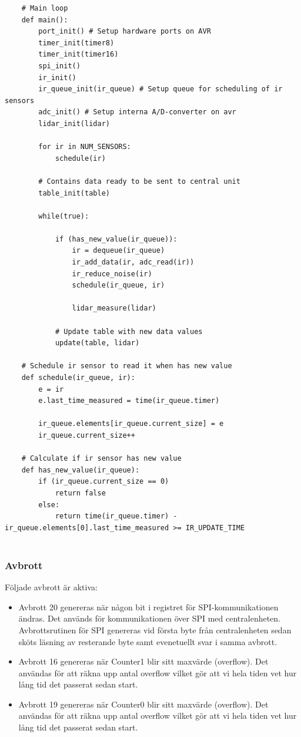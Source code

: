 \documentclass[a4paper,titlepage,12pt]{article}
\begin{document}
    \begin{lstlisting}
    # Main loop
	def main():
        port_init() # Setup hardware ports on AVR
        timer_init(timer8)
        timer_init(timer16)
        spi_init()
        ir_init()
        ir_queue_init(ir_queue) # Setup queue for scheduling of ir sensors
        adc_init() # Setup interna A/D-converter on avr
        lidar_init(lidar)
        
        for ir in NUM_SENSORS:
            schedule(ir)
        
        # Contains data ready to be sent to central unit
        table_init(table)
        
        while(true):

            if (has_new_value(ir_queue)):
                ir = dequeue(ir_queue)
                ir_add_data(ir, adc_read(ir))
                ir_reduce_noise(ir)
                schedule(ir_queue, ir)
        		
                lidar_measure(lidar)
        	
            # Update table with new data values
            update(table, lidar)
        
    # Schedule ir sensor to read it when has new value
    def schedule(ir_queue, ir):
        e = ir
        e.last_time_measured = time(ir_queue.timer)

        ir_queue.elements[ir_queue.current_size] = e
        ir_queue.current_size++
	    
	# Calculate if ir sensor has new value
	def has_new_value(ir_queue):
        if (ir_queue.current_size == 0) 
            return false
        else:
            return time(ir_queue.timer) - ir_queue.elements[0].last_time_measured >= IR_UPDATE_TIME
	    
    \end{lstlisting}

    \subsubsection{Avbrott}
	Följade avbrott är aktiva:
    \begin{itemize}
        \item Avbrott 20 genereras när någon bit i registret för SPI-kommunikationen
        ändras. Det används för kommunikationen över SPI med centralenheten. 
        Avbrottsrutinen för SPI genereras vid första byte från centralenheten 
        sedan sköts läsning av resterande byte samt evenetuellt svar i samma 
        avbrott. 
		\item Avbrott 16 genereras när Counter1 blir sitt maxvärde (overflow). 
		Det användas för att räkna upp antal overflow vilket gör att vi hela tiden 
		vet hur lång tid det passerat sedan start. 
		\item Avbrott 19 genereras när Counter0 blir sitt maxvärde (overflow). 
		Det användas för att räkna upp antal overflow vilket gör att vi hela tiden 
		vet hur lång tid det passerat sedan start. 
    \end{itemize}
	
\end{document}
